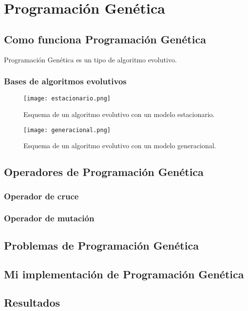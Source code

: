\section{Programación Genética}

\subsection{Como funciona Programación Genética}

Programación Genética es un tipo de algoritmo evolutivo.

\subsubsection{Bases de algoritmos evolutivos}

\begin{figure}[H]
    \centering
	  \texttt{[image: estacionario.png]}
     \label{fig:modelo_estacionario}
    \caption{Esquema de un algoritmo evolutivo con un modelo estacionario.}

\end{figure}

\begin{figure}[H]
    \centering
	  \texttt{[image: generacional.png]}
     \label{fig:modelo_generacioal}
    \caption{Esquema de un algoritmo evolutivo con un modelo generacional.}
\end{figure}

\subsection{Operadores de Programación Genética}

\subsubsection{Operador de cruce}

\subsubsection{Operador de mutación}


\subsection{Problemas de Programación Genética}

\subsection{Mi implementación de Programación Genética}

\subsection{Resultados}
